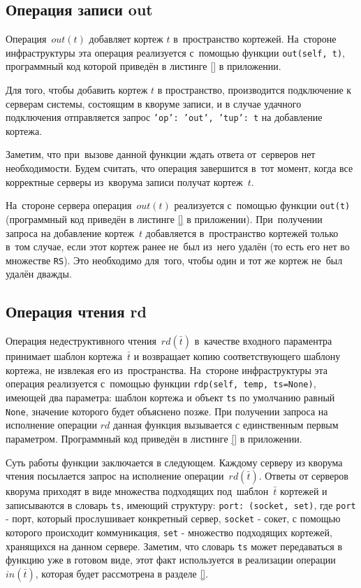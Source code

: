 \subsection{Операция записи out}\label{subsec:6}
Операция~$out(t)$ добавляет кортеж $t$ в~пространство кортежей. На~стороне инфраструктуры эта операция реализуется с~помощью функции \texttt{out(self, t)}, программный код которой приведён в листинге \ref{} в приложении.

Для того, чтобы добавить кортеж $t$ в пространство, производится подключение к серверам системы, состоящим в кворуме записи, и в случае удачного подключения отправляется запрос \texttt{{'op': 'out', 'tup': t}} на добавление кортежа.

Заметим, что при~вызове данной функции ждать ответа от~серверов нет необходимости. Будем считать, что операция завершится в~тот момент, когда все корректные серверы из~кворума записи получат кортеж~$t$.

На~стороне сервера операция~$out(t)$ реализуется с~помощью функции \texttt{out(t)} (программный код приведён в листинге \ref{} в приложении). При~получении запроса на добавление кортеж~$t$ добавляется в~пространство кортежей только в~том случае, если этот кортеж ранее не~был из~него удалён (то есть его нет во множестве \texttt{RS}). Это необходимо для~того, чтобы один и тот же кортеж не~был удалён дважды.

\subsection{Операция чтения rd}\label{subsec:7}
Операция недеструктивного чтения~$rd(\bar t)$ в~качестве входного параментра принимает шаблон кортежа~$\bar t$ и возвращает копию соответствующего шаблону кортежа, не извлекая его из~пространства. На~стороне инфраструктуры эта операция реализуется с~помощью функции \texttt{rdp(self, temp, ts=None)}, имеющей два параметра: шаблон кортежа и объект \texttt{ts} по умолчанию равный \texttt{None}, значение которого будет объяснено позже. При получении запроса на исполнение операции $rd$ данная функция вызывается с единственным первым параметром. Программный код приведён в листинге \ref{} в приложении.

Суть работы функции заключается в следующем. Каждому серверу из кворума чтения посылается запрос на исполнение операции~$rd(\bar t)$. Ответы от серверов кворума приходят в виде множества подходящих под~шаблон~$\bar t$ кортежей и записываются в словарь \texttt{ts}, имеющий структуру: \texttt{port: (socket, set)}, где \texttt{port} - порт, который прослушивает конкретный сервер, \texttt{socket} - сокет, с помощью которого происходит коммуникация, \texttt{set} - множество подходящих кортежей, хранящихся на данном сервере. Заметим, что словарь \texttt{ts} может передаваться в функцию уже в готовом виде, этот факт используется в реализации операции~$in(\bar t)$, которая будет рассмотрена в разделе \ref{}.

